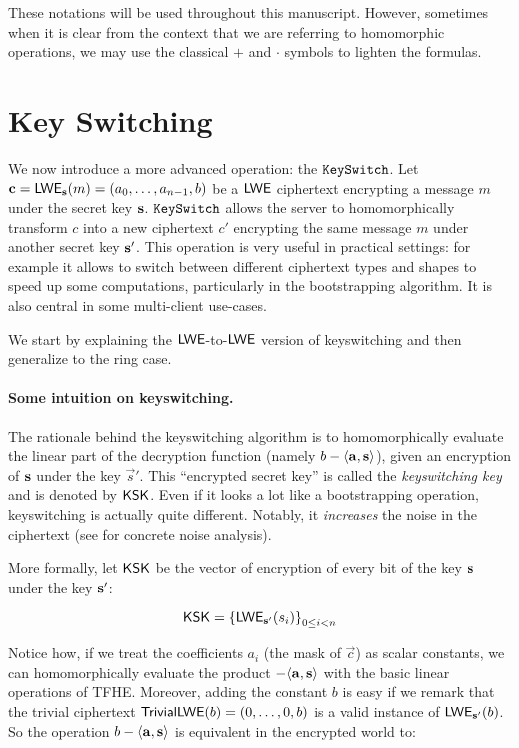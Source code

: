\medskip
These notations will be used throughout this manuscript. However, sometimes when it is clear from the context that we are referring to homomorphic operations, we may use the classical $+$ and $\cdot$ symbols to lighten the formulas.





\section{Key Switching}
\label{sec:keyswitch}

We now introduce a more advanced operation: the $\texttt{KeySwitch}$. Let $\mathbf c = \textsf{LWE}_{\mathbf s}(m) = (a_0, \dots, a_{n-1}, b)$ be a $\textsf{LWE}$ ciphertext encrypting a message $m$ under the secret key $\mathbf s$. $\texttt{KeySwitch}$ allows the server to homomorphically transform $c$ into a new ciphertext $c'$ encrypting the same message $m$ under another secret key $\mathbf s'$. This operation is very useful in practical settings: for example it allows to switch between different ciphertext types and shapes to speed up some computations, particularly in the bootstrapping algorithm. It is also central in some multi-client use-cases.

We start by explaining the $\textsf{LWE}$-to-$\textsf{LWE}$ version of keyswitching and then generalize to the ring case.


\paragraph{Some intuition on keyswitching.}
The rationale behind the keyswitching algorithm is to homomorphically evaluate the linear part of the decryption function (namely $b - \langle \mathbf a, \mathbf s \rangle$), given an encryption of $\mathbf s$ under the key $\vec s'$. This ``encrypted secret key'' is called the \textit{keyswitching key} and is denoted by $\textsf{KSK}$. Even if it looks a lot like a bootstrapping operation, keyswitching is actually quite different. Notably, it \textit{increases} the noise in the ciphertext (see \cite{JC:CGGI20, these_tap} for concrete noise analysis).


More formally, let $\textsf{KSK}$ be the vector of encryption of every bit of the key $\mathbf s$ under the key $\mathbf s'$:

\[
	\textsf{KSK} = \left \{ \textsf{LWE}_{\mathbf s'}(s_i ) \right \}_{0 \le i < n}
\]

Notice how, if we treat the coefficients $a_i$ (the mask of $\vec c$) as scalar constants, we can homomorphically evaluate the product $- \langle \mathbf a ,\mathbf s \rangle$ with the basic linear operations of TFHE. Moreover, adding the constant $b$ is easy if we remark that the trivial ciphertext $\textsf{TrivialLWE}(b) = (0, \dots, 0, b)$ is a valid instance of $\textsf{LWE}_{\mathbf s'}(b)$. So the operation $b - \langle \mathbf a, \mathbf s \rangle$ is equivalent in the encrypted world to:


